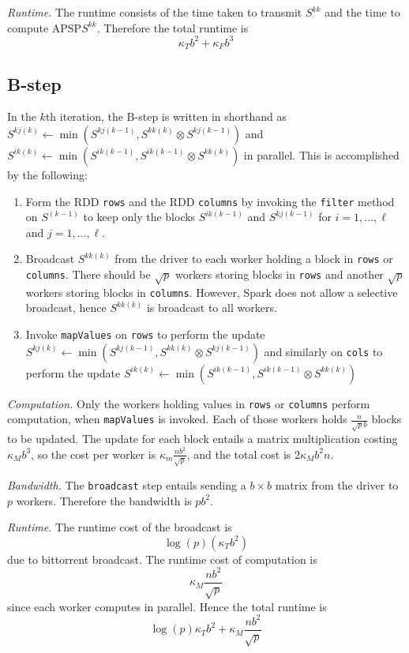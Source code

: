 \documentclass{article} %
\begin{document}
\emph{Runtime.}
The runtime consists of the time taken to transmit $S^{kk}$ and the time to compute $\text{APSP}S^{kk}$.
Therefore the total runtime is
\[
\kappa_T b^2 + \kappa_F b^3
\]

\subsection{B-step}
In the $k$th iteration, the B-step is written in shorthand as
 $S^{kj(k)} \leftarrow \min(S^{kj(k-1)}, S^{kk(k)} \otimes S^{kj(k-1)})$ 
and 
$S^{ik(k)} \leftarrow \min(S^{ik(k-1)}, S^{ik(k-1)} \otimes S^{kk(k)})$
 in parallel.
This is accomplished by the following:
\begin{enumerate}
\item Form the RDD {\tt rows} and the RDD {\tt columns} by invoking
  the {\tt filter} method on $S^{(k-1)}$ to keep only the blocks
  $S^{ik(k-1)}$ and $S^{kj(k-1)}$ for $i = 1,\hdots, \ell$ and $j =
  1,\hdots, \ell$.
\item Broadcast $S^{kk(k)}$ from the driver to each worker holding a
  block in {\tt rows} or {\tt columns}.  There should be $\sqrt{p}$
  workers storing blocks in {\tt rows} and another $\sqrt{p}$ workers
  storing blocks in {\tt columns}. However, Spark does not allow a selective broadcast, hence $S^{kk(k)}$ is broadcast to all workers.
\item Invoke {\tt mapValues} on {\tt rows} to perform the update
  $S^{kj(k)} \leftarrow \min(S^{kj(k-1)}, S^{kk(k)} \otimes S^{kj(k-1)})$ and similarly
  on {\tt cols} to perform the update $S^{ik(k)} \leftarrow \min(S^{ik(k-1)}, S^{ik(k-1)}
  \otimes S^{kk(k)})$
\end{enumerate}

\emph{Computation.}  Only the workers holding values in {\tt rows} or
     {\tt columns} perform computation, when {\tt mapValues} is
     invoked.  Each of those workers holds $\frac{n}{\sqrt{p}b}$
     blocks to be updated.  The update for each block entails a matrix multiplication
     costing $\kappa_M b^3$, so the cost per worker is $\kappa_m
     \frac{nb^2}{\sqrt{p}}$, and the total cost is $2\kappa_M b^2 n$.

\emph{Bandwidth.} The {\tt broadcast} step entails sending a $b \times
b$ matrix from the driver to $p$ workers.  Therefore the
bandwidth is $pb^2$.

\emph{Runtime.} The runtime cost of the broadcast is
\[
\log(p)(\kappa_T b^2)
\]
due to bittorrent broadcast.
The runtime cost of computation is
\[
\kappa_M \frac{nb^2}{\sqrt{p}}
\]
since each worker computes in parallel.
Hence the total runtime is
\[
\log(p)\kappa_T b^2 + \kappa_M \frac{nb^2}{\sqrt{p}}
\]
\end{document}

